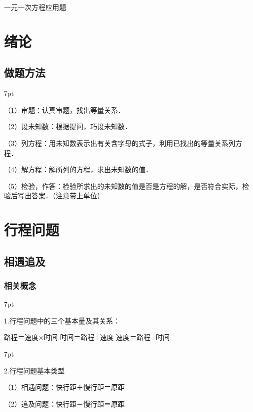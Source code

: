 \documentclass{article}
\newenvironment{wa}{%
\def\FrameCommand{%
\hspace{1pt}%
{\color{LightCoral}\vrule width 2pt}%
{\color{washade}\vrule width 4pt}%
\colorbox{washade}%
}%
\MakeFramed{\advance\hsize-\width\FrameRestore}%
\noindent\hspace{-4.55pt}%
\begin{adjustwidth}{}{7pt}%
\vspace{2pt}\vspace{2pt}%
\normalfont %
}
{%
\vspace{2pt}\end{adjustwidth}\endMakeFramed%
}
\begin{document}
\begin{center}
     {\heiti 一元一次方程应用题 }
\end{center}
\tableofcontents

\newpage
\section{绪论}
\subsection{做题方法}
\begin{wa}
\quad \quad （1）审题：认真审题，找出等量关系．

（2）设未知数：根据提问，巧设未知数．

（3）列方程：用未知数表示出有关含字母的式子，利用已找出的等量关系列方程．

（4）解方程：解所列的方程，求出未知数的值．

（5）检验，作答：检验所求出的未知数的值是否是方程的解，是否符合实际，检验后写出答案．（注意带上单位）
\end{wa}

\newpage
\section{行程问题}
\subsection{相遇追及}
\subsubsection*{相关概念}
\begin{wa}
\quad \quad1.行程问题中的三个基本量及其关系：

路程＝速度×时间 \quad 时间＝路程÷速度 \quad 速度＝路程÷时间

\end{wa}
\begin{wa}
    \quad \quad    2.行程问题基本类型

（1）相遇问题：快行距＋慢行距＝原距

（2）追及问题：快行距－慢行距＝原距
\end{wa}
\end{document}
